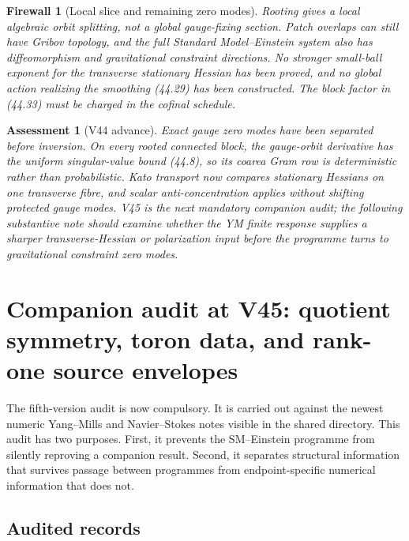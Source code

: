 \documentclass[11pt]{article}
\newtheorem{assessment}[theorem]{Assessment}
\newtheorem{firewall}[theorem]{Firewall}
\begin{document}
\begin{firewall}[Local slice and remaining zero modes]
\label{fw:v11v44-slice}
Rooting gives a local algebraic orbit splitting, not a global
gauge-fixing section.  Patch overlaps can still have Gribov topology,
and the full Standard Model--Einstein system also has diffeomorphism
and gravitational constraint directions.  No stronger small-ball
exponent for the transverse stationary Hessian has been proved, and no
global action realizing the smoothing (44.29) has been constructed.
The block factor in (44.33) must be charged in the cofinal schedule.
\end{firewall}

\begin{assessment}[V44 advance]
\label{ass:v11v44}
Exact gauge zero modes have been separated before inversion.  On every
rooted connected block, the gauge-orbit derivative has the uniform
singular-value bound (44.8), so its coarea Gram row is deterministic
rather than probabilistic.  Kato transport now compares stationary
Hessians on one transverse fibre, and scalar anti-concentration applies
without shifting protected gauge modes.  V45 is the next mandatory
companion audit; the following substantive note should examine whether
the YM finite response supplies a sharper transverse-Hessian or
polarization input before the programme turns to gravitational
constraint zero modes.
\end{assessment}

\section{Companion audit at V45: quotient symmetry, toron data, and
rank-one source envelopes}
\label{sec:v11v45}

The fifth-version audit is now compulsory.  It is carried out against
the newest numeric Yang--Mills and Navier--Stokes notes visible in the
shared directory.  This audit has two purposes.  First, it prevents the
SM--Einstein programme from silently reproving a companion result.
Second, it separates structural information that survives passage
between programmes from endpoint-specific numerical information that
does not.

\subsection{Audited records}
\end{document}
